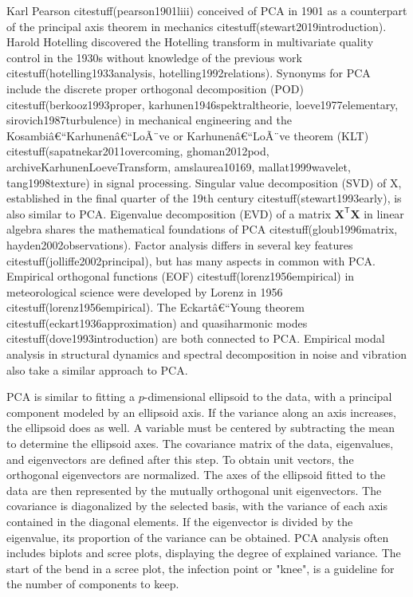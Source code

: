 \documentclass[preprint,12pt]{elsarticle}
\begin{document}
Karl Pearson citestuff(pearson1901liii) conceived of PCA in 1901 as a counterpart of the principal axis theorem in mechanics citestuff(stewart2019introduction). Harold Hotelling discovered the Hotelling transform in multivariate quality control in the 1930s without knowledge of the previous work citestuff(hotelling1933analysis, hotelling1992relations). Synonyms for PCA include the discrete proper orthogonal decomposition (POD) citestuff(berkooz1993proper, karhunen1946spektraltheorie, loeve1977elementary, sirovich1987turbulence) in mechanical engineering and the Kosambiâ€“Karhunenâ€“LoÃ¨ve or Karhunenâ€“LoÃ¨ve theorem (KLT) citestuff(sapatnekar2011overcoming, ghoman2012pod, archiveKarhunenLoeveTransform, amslaurea10169, mallat1999wavelet, tang1998texture) in signal processing. Singular value decomposition (SVD) of X, established in the final quarter of the 19th century citestuff(stewart1993early), is also similar to PCA. Eigenvalue decomposition (EVD) of a matrix $\mathbf{X}^{\mathsf{T}}\mathbf{X}$ in linear algebra shares the mathematical foundations of PCA citestuff(gloub1996matrix, hayden2002observations). Factor analysis differs in several key features citestuff(jolliffe2002principal), but has many aspects in common with PCA. Empirical orthogonal functions (EOF) citestuff(lorenz1956empirical) in meteorological science were developed by Lorenz in 1956 citestuff(lorenz1956empirical). The Eckartâ€“Young theorem citestuff(eckart1936approximation) and quasiharmonic modes citestuff(dove1993introduction) are both connected to PCA. Empirical modal analysis in structural dynamics and spectral decomposition in noise and vibration also take a similar approach to PCA.

PCA is similar to fitting a $p$-dimensional ellipsoid to the data, with a principal component modeled by an ellipsoid axis. If the variance along an axis increases, the ellipsoid does as well.
A variable must be centered by subtracting the mean to determine the ellipsoid axes. The covariance matrix of the data, eigenvalues, and eigenvectors are defined after this step. To obtain unit vectors, the orthogonal eigenvectors are normalized. The axes of the ellipsoid fitted to the data are then represented by the mutually orthogonal unit eigenvectors. The covariance is diagonalized by the selected basis, with the variance of each axis contained in the diagonal elements. If the eigenvector is divided by the eigenvalue, its proportion of the variance can be obtained.
PCA analysis often includes biplots and scree plots, displaying the degree of explained variance. The start of the bend in a scree plot, the infection point or "knee", is a guideline for the number of components to keep.
\end{document}
